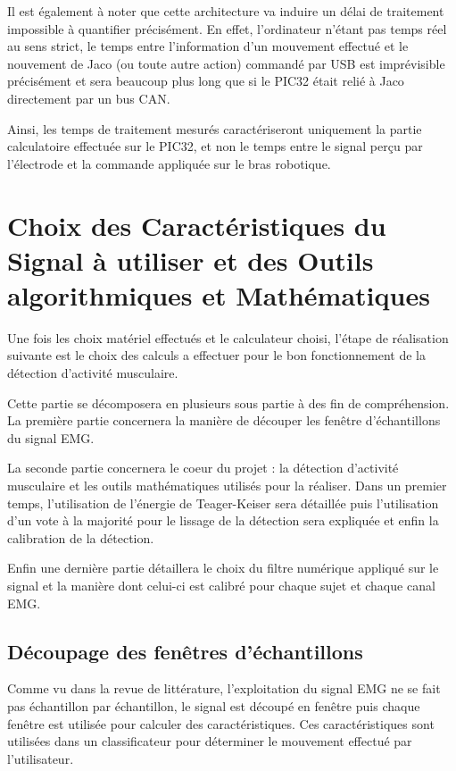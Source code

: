 \documentclass[letterpaper, twoside, 12pt, memoire, creativecommons, hyperref]{thETS}
\begin{document}
Il est également à noter que cette architecture va induire un délai de traitement impossible à quantifier précisément. En effet, l'ordinateur n'étant pas temps réel au sens strict, le temps entre l'information d'un mouvement effectué et le nouvement de Jaco (ou toute autre action) commandé par USB est imprévisible précisément et sera beaucoup plus long que si le PIC32 était relié à Jaco directement par un bus CAN. 

Ainsi, les temps de traitement mesurés caractériseront uniquement la partie calculatoire effectuée sur le PIC32, et non le temps entre le signal perçu par l'électrode et la commande appliquée sur le bras robotique.

\section{Choix des Caractéristiques du Signal à utiliser et des Outils algorithmiques et Mathématiques}

Une fois les choix matériel effectués et le calculateur choisi, l'étape de réalisation suivante est le choix des calculs a effectuer pour le bon fonctionnement de la détection d'activité musculaire. 

Cette partie se décomposera en plusieurs sous partie à des fin de compréhension. La première partie concernera la manière de découper les fenêtre d'échantillons du signal EMG. 

La seconde partie concernera le coeur du projet : la détection d'activité musculaire et les outils mathématiques utilisés pour la réaliser. Dans un premier temps, l'utilisation de l'énergie de Teager-Keiser sera détaillée puis l'utilisation d'un vote à la majorité pour le lissage de la détection sera expliquée et enfin la calibration de la détection.

Enfin une dernière partie détaillera le choix du filtre numérique appliqué sur le signal et la manière dont celui-ci est calibré pour chaque sujet et chaque canal EMG.

\subsection{Découpage des fenêtres d'échantillons}

Comme vu dans la revue de littérature, l'exploitation du signal EMG ne se fait pas échantillon par échantillon, le signal est découpé en fenêtre puis chaque fenêtre est utilisée pour calculer des caractéristiques. Ces caractéristiques sont utilisées dans un classificateur pour déterminer le mouvement effectué par l'utilisateur. 
\end{document}
